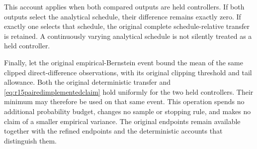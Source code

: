 This account applies when both compared outputs are held controllers.
If both outputs select the analytical schedule, their difference remains
exactly zero. If exactly one selects that schedule, the original complete
schedule-relative transfer is retained. A continuously varying analytical
schedule is not silently treated as a held controller.

Finally, let the original empirical-Bernstein event bound the mean of the
same clipped direct-difference observations, with its original clipping
threshold and tail allowance. Both the original deterministic transfer
and \eqref{eq:r15pairedimplementedclaim} hold uniformly for the two
held controllers. Their minimum may therefore be used on that same
event. This operation spends no additional probability budget, changes
no sample or stopping rule, and makes no claim of a smaller empirical
variance. The original endpoints remain available together with the
refined endpoints and the deterministic accounts that distinguish them.

